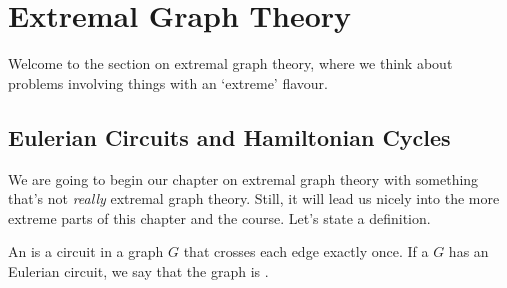 \documentclass[a4paper]{scrartcl}
\begin{document}
\section{Extremal Graph Theory}

Welcome to the section on extremal graph theory, where we think about problems involving things with an `extreme' flavour.

\subsection{Eulerian Circuits and Hamiltonian Cycles}

We are going to begin our chapter on extremal graph theory with something that's not \emph{really} extremal graph theory. Still, it will lead us nicely into the more extreme parts of this chapter and the course. Let's state a definition.

\begin{definition}
	An  is a circuit in a graph $G$ that crosses each edge exactly once. If a $G$ has an Eulerian circuit, we say that the graph is .
\end{definition}
\end{document}
